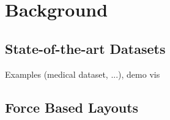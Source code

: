 \chapter{Background}

\section{State-of-the-art Datasets}

Examples (medical dataset, ...), demo vis \\

\section{Force Based Layouts}
